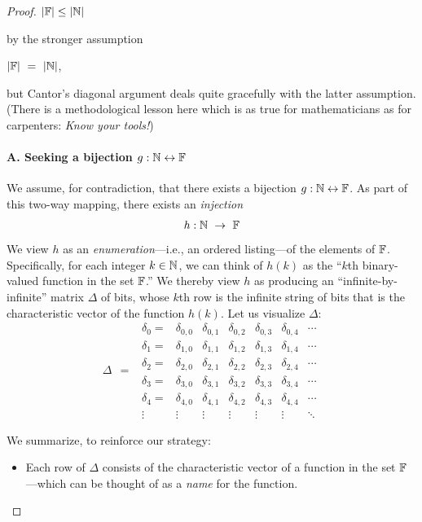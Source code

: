 \begin{proof}
\hspace*{.35in}$|\mathbb{F}| \leq |\mathbb{N}|$

\smallskip

\noindent
by the stronger assumption

\smallskip

\hspace*{.35in}$|\mathbb{F}| \ = \ |\mathbb{N}|$,

\smallskip

\noindent
but Cantor's diagonal argument deals quite gracefully with the latter assumption.  (There is a methodological lesson here which is as true for mathematicians as for carpenters:  {\em Know your tools!})

\paragraph{A. Seeking a bijection $g: \mathbb{N} \leftrightarrow \mathbb{F}$}

We assume, for contradiction, that there exists a bijection $g: \mathbb{N} \leftrightarrow \mathbb{F}$.  As part of this two-way mapping, there exists an {\em injection}
\[ 
h: \mathbb{N} \ \rightarrow \ \mathbb{F}
\]
We view $h$ as an {\em enumeration}---i.e., an ordered listing---of the elements of $\mathbb{F}$.  Specifically, for each integer $k \in \mathbb{N}$, we can think of $h(k)$ as the ``$k$th binary-valued function in the set $\mathbb{F}$.''  We thereby view $h$ as producing an ``infinite-by-infinite'' matrix $\Delta$ of bits, whose $k$th row is the infinite string of bits that is the characteristic vector of the
function $h(k)$.  Let us visualize $\Delta$:
\[ \Delta \ \ = \ \
\begin{array}{ccccccc}
\delta_0 = &
\delta_{0,0} & \delta_{0,1} & \delta_{0,2} & \delta_{0,3} &
	\delta_{0,4} & \cdots \\
\delta_1 = &
\delta_{1,0} & \delta_{1,1} & \delta_{1,2} & \delta_{1,3} &
	\delta_{1,4} & \cdots \\
\delta_2 = &
\delta_{2,0} & \delta_{2,1} & \delta_{2,2} & \delta_{2,3} &
	\delta_{2,4} & \cdots \\
\delta_3 = &
\delta_{3,0} & \delta_{3,1} & \delta_{3,2} & \delta_{3,3} &
	\delta_{3,4} & \cdots \\ 
\delta_4 = &
\delta_{4,0} & \delta_{4,1} & \delta_{4,2} & \delta_{4,3} &
	\delta_{4,4} & \cdots \\ 
\vdots &
\vdots  & \vdots  & \vdots  & \vdots  & \vdots  & \ddots
\end{array}
\]

\noindent We summarize, to reinforce our strategy:
\begin{itemize}
\item
Each row of $\Delta$ consists of the characteristic vector of a function in the set $\mathbb{F}$---which can be thought of as a {\em name} for the function.


\end{itemize}
\end{proof}
